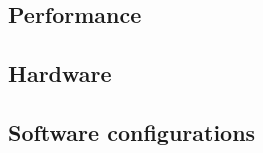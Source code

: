 \label{chap:results}


\subsection{Performance}



\subsection{Hardware}


\subsection{Software configurations}



